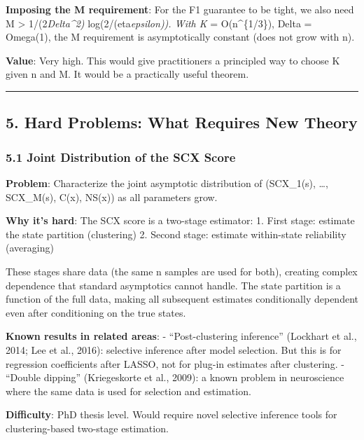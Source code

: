 \documentclass[
  12pt,
]{article}
\begin{document}
\textbf{Imposing the M requirement}: For the F1 guarantee to be tight,
we also need M \textgreater{} 1/(2\emph{Delta\^{}2) }
log(2/(eta\emph{epsilon)). With K} = O(n\^{}\{1/3\}), Delta = Omega(1),
the M requirement is asymptotically constant (does not grow with n).

\textbf{Value}: Very high. This would give practitioners a principled
way to choose K given n and M. It would be a practically useful theorem.

\begin{center}\rule{0.5\linewidth}{0.5pt}\end{center}

\subsection{5. Hard Problems: What Requires New
Theory}\label{hard-problems-what-requires-new-theory}

\subsubsection{5.1 Joint Distribution of the SCX
Score}\label{joint-distribution-of-the-scx-score}

\textbf{Problem}: Characterize the joint asymptotic distribution of
(SCX\_1(s), \ldots, SCX\_M(s), C(x), NS(x)) as all parameters grow.

\textbf{Why it's hard}: The SCX score is a two-stage estimator: 1. First
stage: estimate the state partition (clustering) 2. Second stage:
estimate within-state reliability (averaging)

These stages share data (the same n samples are used for both), creating
complex dependence that standard asymptotics cannot handle. The state
partition is a function of the full data, making all subsequent
estimates conditionally dependent even after conditioning on the true
states.

\textbf{Known results in related areas}: - ``Post-clustering inference''
(Lockhart et al., 2014; Lee et al., 2016): selective inference after
model selection. But this is for regression coefficients after LASSO,
not for plug-in estimates after clustering. - ``Double dipping''
(Kriegeskorte et al., 2009): a known problem in neuroscience where the
same data is used for selection and estimation.

\textbf{Difficulty}: PhD thesis level. Would require novel selective
inference tools for clustering-based two-stage estimation.
\end{document}
